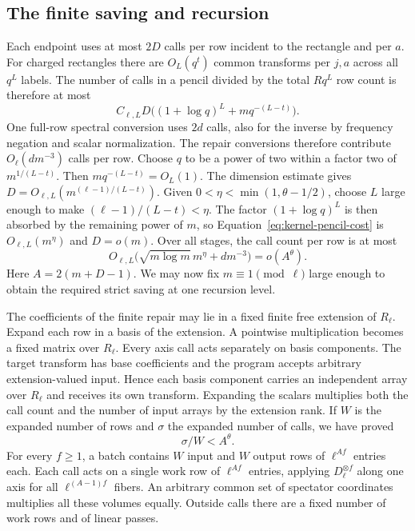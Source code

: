 

\subsection{The finite saving and recursion}

Each endpoint uses at most \(2D\) calls per row incident to the
rectangle and per \(a\). For charged rectangles there are
\(O_L(q^t)\) common transforms per \(j,a\) across all \(q^L\) labels.
The number of calls in a pencil divided by the total \(Rq^L\) row
count is therefore at most
\begin{equation}
 \label{eq:kernel-pencil-cost}
 C_{\ell,L}D\bigl((1+\log q)^L + m q^{-(L-t)}\bigr).
\end{equation}
One full-row spectral conversion uses \(2d\) calls, also for the
inverse by frequency negation and scalar normalization. The repair
conversions therefore contribute \(O_\ell(dm^{-3})\) calls per row.
Choose \(q\) to be a power of two within a factor two of
\(m^{1/(L-t)}\). Then \(m q^{-(L-t)}=O_L(1)\).
The dimension estimate gives
\(D=O_{\ell,L}(m^{(\ell-1)/(L-t)})\). Given
\(0<\eta<\min(1,\theta-1/2)\), choose \(L\) large enough to make
\((\ell-1)/(L-t)<\eta\). The factor \((1+\log q)^L\) is then
absorbed by the remaining power of \(m\), so
Equation~\eqref{eq:kernel-pencil-cost} is \(O_{\ell,L}(m^\eta)\)
and \(D=o(m)\). Over all stages, the call count per row is at most
\[
 O_{\ell,L}\bigl(\sqrt{m\log m}\,m^\eta+dm^{-3}\bigr)
       =o(A^\theta).
\]
Here \(A=2(m+D-1)\). We may now fix \(m\equiv 1\pmod\ell\) large
enough to obtain the required strict saving at one recursion level.

The coefficients of the finite repair may lie in a fixed finite
free extension of \(R_\ell\). Expand each row in a basis of the
extension. A pointwise multiplication becomes a fixed matrix over
\(R_\ell\). Every axis call acts separately on basis components.
The target transform has base coefficients and the program accepts
arbitrary extension-valued input. Hence each basis component carries
an independent array over \(R_\ell\) and receives its own transform.
Expanding the scalars multiplies both the call count and the number
of input arrays by the extension rank. If \(W\) is the expanded number of rows and
\(\sigma\) the expanded number of calls, we have proved
\begin{equation}
 \label{eq:kernel-template-saving}
                          \sigma/W < A^\theta .
\end{equation}
For every \(f\ge1\), a batch contains \(W\) input and \(W\) output
rows of \(\ell^{Af}\) entries each. Each call acts on a single work
row of \(\ell^{Af}\) entries, applying \(D_\ell^{\otimes f}\) along
one axis for all \(\ell^{(A-1)f}\) fibers. An arbitrary common set of
spectator coordinates multiplies all these volumes equally. Outside
calls there are a fixed number of work rows and of linear passes.

